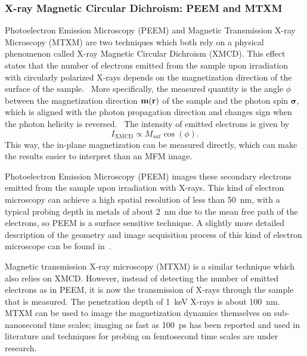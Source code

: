 \documentclass[12pt,a4paper]{article}
\renewcommand{\vec}[1]{\boldsymbol{#1}}
\begin{document}
\subsubsection{X-ray Magnetic Circular Dichroism: PEEM and MTXM}
Photoelectron Emission Microscopy (PEEM) and Magnetic Transmission X-ray Microscopy (MTXM) are two techniques which both rely on a physical phenomenon called X-ray Magnetic Circular Dichroism (XMCD). This effect states that the number of electrons emitted from the sample upon irradiation with circularly polarized X-rays depends on the magnetization direction of the surface of the sample.~\cite{NML_Carlton} More specifically, the measured quantity is the angle $\phi$ between the magnetization direction $\vb{m(\vb{r})}$ of the sample and the photon spin $\vec{\sigma}$, which is aligned with the photon propagation direction and changes sign when the photon helicity is reversed.~\cite{PEEM} The intensity of emitted electrons is given by
\begin{equation}
    I_{\mathrm{XMCD}} \propto M_{sat} \cos(\phi) \mathrm{.}
    \label{eq:XMCD}
\end{equation} 
This way, the in-plane magnetization can be measured directly, which can make the results easier to interpret than an MFM image. \par

Photoelectron Emission Microscopy (PEEM) images these secondary electrons emitted from the sample upon irradiation with X-rays. This kind of electron microscopy can achieve a high spatial resolution of less than \SI{50}{\nano\metre}, with a typical probing depth in metals of about \SI{2}{\nano\metre} due to the mean free path of the electrons, so PEEM is a surface sensitive technique. A slightly more detailed description of the geometry and image acquisition process of this kind of electron microscope can be found in~\cite{PEEM}. \par 

Magnetic transmission X-ray microscopy (MTXM) is a similar technique which also relies on XMCD. However, instead of detecting the number of emitted electrons as in PEEM, it is now the transmission of X-rays through the sample that is measured. The penetration depth of \SI{1}{\kilo\electronvolt} X-rays is about \SI{100}{\nano\metre}.~\cite{Imaging_MTXM} MTXM can be used to image the magnetization dynamics themselves on sub-nanosecond time scales; imaging as fast as \SI{100}{\pico\second} has been reported and used in literature and techniques for probing on femtosecond time scales are under research.~\cite{SubnanosecondPropagation_AnisotropyChains, Imaging_MTXM} \par
\end{document}
